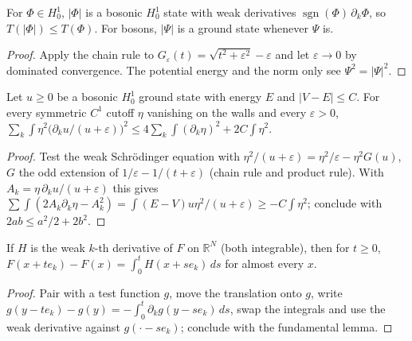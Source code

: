 \begin{lemma}
  \label{lem:line_absW}
  \leanok
  For $\Phi\in H^1_0$, $|\Phi|$ is a bosonic $H^1_0$ state with weak derivatives $\operatorname{sgn}(\Phi)\,\partial_k\Phi$,
  so $T(|\Phi|)\le T(\Phi)$. For bosons, $|\Psi|$ is a ground state whenever $\Psi$ is.
\end{lemma}
\begin{proof}
  \leanok
  Apply the chain rule to $G_\varepsilon(t)=\sqrt{t^2+\varepsilon^2}-\varepsilon$ and let $\varepsilon\to0$ by dominated
  convergence. The potential energy and the norm only see $\Psi^2=|\Psi|^2$.
\end{proof}

\begin{lemma}
  \label{lem:line_logest}
  \leanok
  Let $u\ge0$ be a bosonic $H^1_0$ ground state with energy $E$ and $|V-E|\le C$. For every symmetric $C^1$ cutoff
  $\eta$ vanishing on the walls and every $\varepsilon>0$,
  $\sum_k\int\eta^2\big(\partial_ku/(u+\varepsilon)\big)^2\le4\sum_k\int(\partial_k\eta)^2+2C\int\eta^2$.
\end{lemma}
\begin{proof}
  \leanok
  Test the weak Schr\"odinger equation with $\eta^2/(u+\varepsilon)=\eta^2/\varepsilon-\eta^2G(u)$, $G$ the odd extension of
  $1/\varepsilon-1/(t+\varepsilon)$ (chain rule and product rule). With $A_k=\eta\,\partial_ku/(u+\varepsilon)$ this gives
  $\sum\int(2A_k\partial_k\eta-A_k^2)=\int(E-V)u\eta^2/(u+\varepsilon)\ge-C\int\eta^2$; conclude with
  $2ab\le a^2/2+2b^2$.
\end{proof}

\begin{lemma}
  \label{lem:line_translate}
  \leanok
  If $H$ is the weak $k$-th derivative of $F$ on $\mathbb R^N$ (both integrable), then for $t\ge0$,
  $F(x+te_k)-F(x)=\int_0^tH(x+se_k)\,ds$ for almost every $x$.
\end{lemma}
\begin{proof}
  \leanok
  Pair with a test function $g$, move the translation onto $g$, write $g(y-te_k)-g(y)=-\int_0^t\partial_kg(y-se_k)\,ds$,
  swap the integrals and use the weak derivative against $g(\cdot-se_k)$; conclude with the fundamental lemma.
\end{proof}

